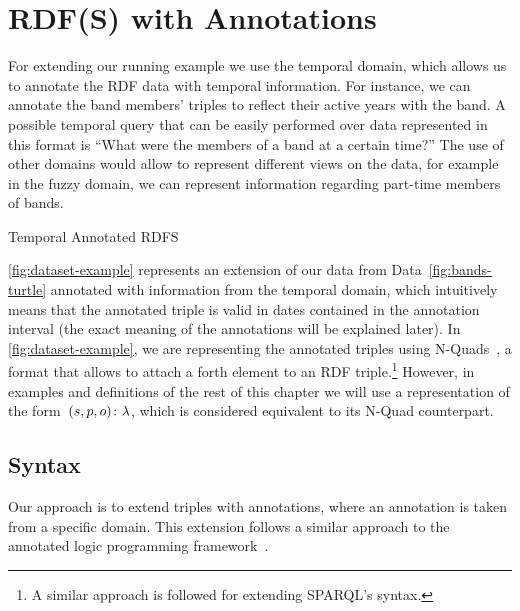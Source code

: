 \section{RDF(S) with Annotations}
\label{sec:annotated-rdfs}


For extending our running example we use the temporal domain, which allows us to annotate the RDF data with temporal
information. For instance, we can annotate the band members' triples to reflect their active years with the band. 
%
A possible temporal query that can be easily performed over data represented in this format is ``What were the members
of a band at a certain time?''
%
The use of other domains would allow to represent different views on the data, for example in the fuzzy domain, we can
represent information regarding part-time members of bands.



\begin{data}[t]
  \centering
  
  \caption{Temporal Annotated RDFS}
  \label{fig:dataset-example}
\end{data}



\cref{fig:dataset-example} represents an extension of our \usecase data from Data~\ref{fig:bands-turtle} annotated
with information from the temporal domain, which intuitively means that the annotated triple is valid in dates contained
in the annotation interval (the exact meaning of the annotations will be explained later).
%
In \cref{fig:dataset-example}, we are representing the annotated triples using N-Quads~\cite{CyganiakHarthHogan:2009aa},
a format that allows to attach a forth element to an \ac{RDF} triple.\footnote{A similar approach is followed for
  extending SPARQL's syntax.}
%
However, in examples and definitions of the rest of this chapter we will use a representation of the
form~$\mbox{$(s,p,o)\colon\lambda$}$, which is considered equivalent to its N-Quad counterpart. 





\newif\ifnormalisedardf\normalisedardftrue

\subsection{Syntax}

Our approach is to extend triples with annotations, where an annotation is taken from a specific domain.
%
This extension follows a similar approach to the annotated logic programming framework~\cite{KiferSubrahmanian:1992aa}.

